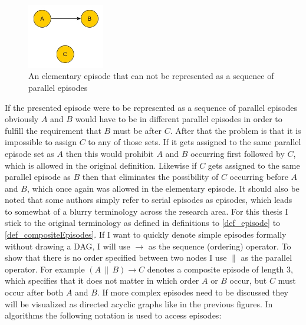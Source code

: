 \begin{figure}[h]
	\centering
  	\includegraphics[width=0.3\textwidth]{notSequenceOfSet}
	\caption{An elementary episode that can not be represented as a sequence of parallel episodes}
	\label{fig_notSequenceOfSet}
\end{figure}

If the presented episode were to be represented as a sequence of parallel episodes obviously $A$ and $B$ would have to be in different parallel episodes in order to fulfill the requirement that $B$ must be after $C$. After that the problem is that it is impossible to assign $C$ to any of those sets. If it gets assigned to the same parallel episode set as $A$ then this would prohibit $A$ and $B$ occurring first followed by $C$, which is allowed in the original definition. Likewise if $C$ gets assigned to the same parallel episode as $B$ then that eliminates the possibility of $C$ occurring before $A$ and $B$, which once again was allowed in the elementary episode. It should also be noted that some authors simply refer to serial episodes as episodes, which leads to somewhat of a blurry terminology across the research area. For this thesis I stick to the original terminology as defined in definitions to \ref{def_episode} to \ref{def_compositeEpisodes}. \newline
If I want to quickly denote simple episodes formally without drawing a DAG, I will use $\rightarrow$ as the sequence (ordering) operator. To show that there is no order specified between two nodes I use $\|$ as the parallel operator. For example $(A \, \| \, B ) \rightarrow C$ denotes a composite episode of length 3, which specifies that it does not matter in which order $A$ or $B$ occur, but $C$ must occur after both $A$ and $B$. If more complex episodes need to be discussed they will be visualized as directed acyclic graphs like in the previous figures. \newline 
In algorithms the following notation is used to access episodes:

